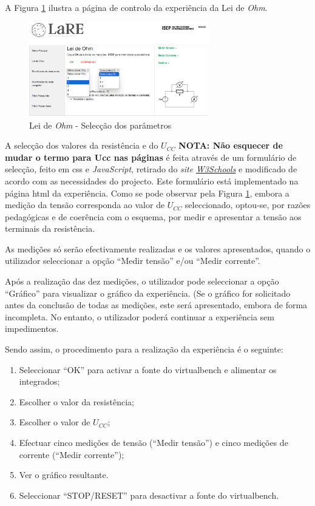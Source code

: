 A Figura \ref{fig:pagmenuCTRL} ilustra a página de controlo da experiência da Lei de \textit{Ohm}. 

\begin{figure}[hbtp]
	\centering
	\includegraphics[width=0.7\textwidth]{figures/ohm_page_controlo-FULL.png}
	\caption{Lei de \textit{Ohm} - Selecção dos parâmetros}
	\label{fig:pagmenuCTRL}
\end{figure}

A selecção dos valores da resistência e do $U_{CC}$ \textbf{NOTA: Não esquecer de mudar o termo para Ucc nas páginas} é feita através de um formulário de selecção, feito em \acrshort{css} e \textit{JavaScript}, retirado do \textit{site} \href{https://www.w3schools.com/howto/howto_custom_select.asp}{\textit{W3Schools}} e modificado de acordo com as necessidades do projecto. Este formulário está implementado na página \acrshort{html} da experiência. Como se pode observar pela Figura \ref{fig:pagmenuCTRL}, embora a medição da tensão corresponda ao valor de $U_{CC}$ seleccionado, optou-se, por razões pedagógicas e de coerência com o esquema, por medir e apresentar a tensão aos terminais da resistência.

As medições só serão efectivamente realizadas e os valores apresentados, quando o utilizador seleccionar a opção ``Medir tensão'' e/ou ``Medir corrente''. 

Após a realização das dez medições, o utilizador pode seleccionar a opção ``Gráfico'' para visualizar o gráfico da experiência. (Se o gráfico for solicitado antes da conclusão de todas as medições, este será apresentado, embora de forma incompleta. No entanto, o utilizador poderá continuar a experiência sem impedimentos.

Sendo assim, o procedimento para a realização da experiência é o seguinte:
\begin{enumerate}
	\item Seleccionar ``OK'' para activar a fonte do \acrshort{virtualbench} e alimentar os integrados;
	\item Escolher o valor da resistência;
	\item Escolher o valor de $U_{CC}$;
	\item Efectuar cinco medições de tensão (``Medir tensão'') e cinco medições de corrente (``Medir corrente'');
	\item Ver o gráfico resultante.
	\item Seleccionar ``STOP/RESET'' para desactivar a fonte do \acrshort{virtualbench}.
\end{enumerate}

